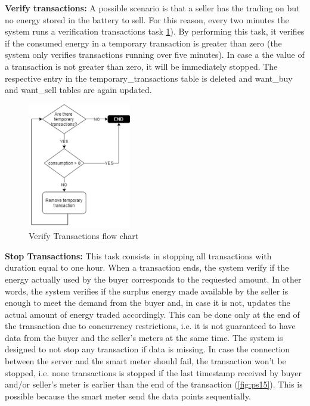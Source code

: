 \textbf{Verify transactions:} A possible scenario is that a seller has the trading on but no energy stored in the battery to sell. For this reason, every two minutes the system runs a verification transactions task \cref{fig:ps14}). By performing this task, it verifies if the consumed energy in a temporary transaction is greater than zero (the system only verifies transactions running over five minutes). In case a the value of a transaction is not greater than zero, it will be immediately stopped. The respective entry in the temporary\_transactions table is deleted and want\_buy and want\_sell tables are again updated.


\begin{figure}[h]
\centering
\includegraphics[width=0.4\textwidth]{./Images/ps14}
\caption{Verify Transactions flow chart}
\label{fig:ps14}
\end{figure}


\textbf{Stop Transactions:} This task consists in stopping all transactions with duration equal to one hour. When a transaction ends, the system verify if the energy actually used  by the buyer corresponds to the requested amount. In other words, the system verifies if the surplus energy made available by the seller is enough to meet the demand from the buyer and, in case it is not, updates the actual amount of energy traded accordingly. This can be done only at the end of the transaction due to concurrency restrictions, i.e. it is not guaranteed to have data from the buyer and the seller’s meters at the same time. The system is designed to not  stop any transaction if data is missing. In case the connection between the server and the smart meter should fail, the transaction won’t be stopped, i.e. none transactions is stopped if the last timestamp received by buyer and/or seller’s meter is earlier than the end of the transaction (\cref{fig:ps15}). This is possible because the smart meter send the data points sequentially.



